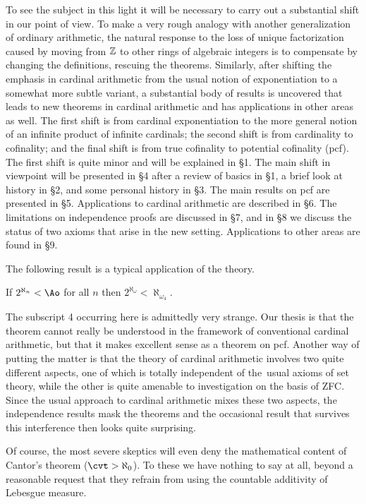 To see the subject in this light it will be necessary to 
carry out a
substantial shift in our point of view.  To make a very 
rough analogy
with another generalization of ordinary arithmetic, the 
natural
response to the loss of unique
factorization caused by moving from $\Bbb{Z}$ to other 
rings of algebraic
integers is to compensate by changing the definitions, 
rescuing the
theorems.  Similarly, after shifting the emphasis in 
cardinal arithmetic
from the usual notion of exponentiation to a somewhat more 
subtle
variant, a substantial body of results is uncovered that 
leads to new
theorems in cardinal arithmetic and has applications in 
other areas as
well.  The first  shift is from cardinal exponentiation to 
the more
general notion of an infinite product of infinite 
cardinals; the
second shift is from cardinality to cofinality; and the 
final shift is
from true cofinality to potential cofinality (pcf).  The 
first
shift is quite minor and will be explained in \S1.
The main shift in viewpoint will be
presented in \S4 after a review of basics in \S1, a brief 
look at
history in \S2, and some personal history in \S3.
The main results on pcf are presented in \S5.
Applications to cardinal arithmetic are described in \S6. 
The  limitations on
independence proofs are discussed in \S7, and in \S8 we 
discuss
the status of two axioms that arise in the new setting.
  Applications to other areas are found in \S9.
 
The following result is a typical application of the theory.
 
 If $2^{\aleph_n}<\Ao$ for all $n$ then
$2^{\aleph_\omega}<\aleph_{\omega_4}$.
\endproclaim
 
 The subscript 4 occurring here is admittedly very 
strange.  Our thesis
is that the theorem cannot really be understood in the 
framework of
conventional cardinal arithmetic, but that it makes 
excellent sense as
a theorem on pcf.  Another way of putting the matter is 
that the
theory of cardinal arithmetic involves two quite different 
aspects,
one of which is totally independent of the\ usual axioms of
set theory, while the other is
quite amenable to investigation on the basis of ZFC. Since 
the usual
approach to cardinal arithmetic mixes these two aspects, the
independence results mask the theorems and the occasional 
result
that survives this interference then looks quite surprising.
 
Of course, the most severe skeptics will even deny the 
mathematical
content of Cantor's theorem ($\cvt >\aleph_0$). To these 
we have
nothing to say at all, beyond a reasonable request that 
they refrain
from using the countable additivity of Lebesgue measure.
 
